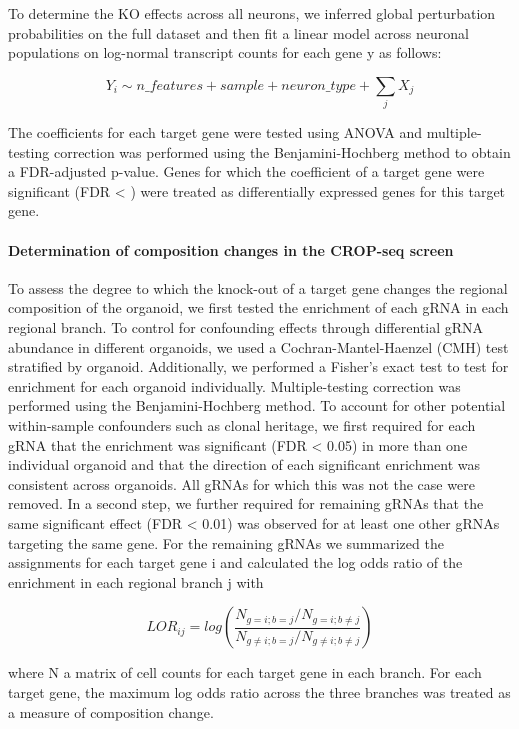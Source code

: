 To determine the KO effects across all neurons, we inferred global perturbation probabilities on the full dataset and then fit a linear model across neuronal populations on log-normal transcript counts for each gene y as follows:
 
\[ Y_i \sim n\_features + sample + neuron\_type + \sum_j X_j \]
 
The coefficients for each target gene were tested using ANOVA and multiple-testing correction was performed using the Benjamini-Hochberg method to obtain a FDR-adjusted p-value. Genes for which the coefficient of a target gene were significant (FDR < ) were treated as differentially expressed genes for this target gene.
 
 
\paragraph{Determination of composition changes in the CROP-seq screen}
To assess the degree to which the knock-out of a target gene changes the regional composition of the organoid, we first tested the enrichment of each gRNA in each regional branch. To control for confounding effects through differential gRNA abundance in different organoids, we used a Cochran-Mantel-Haenzel (CMH) test stratified by organoid. Additionally, we performed a Fisher’s exact test to test for enrichment for each organoid individually. Multiple-testing correction was performed using the Benjamini-Hochberg method. To account for other potential within-sample confounders such as clonal heritage, we first required for each gRNA that the enrichment was significant (FDR < 0.05) in more than one individual organoid and that the direction of each significant enrichment was consistent across organoids. All gRNAs for which this was not the case were removed. In a second step, we further required for remaining gRNAs that the same significant effect (FDR < 0.01) was observed for at least one other gRNAs targeting the same gene. For the remaining gRNAs we summarized the assignments for each target gene i  and calculated the log odds ratio of the enrichment in each regional branch j with
 
\[ LOR_{ij} = log(\frac{N_{g=i;b=j} / N_{g=i;b\neq j}} {N_{g\neq i;b=j} / N_{g\neq i;b\neq j}} ) \]   
 
where N a matrix of cell counts for each target gene in each branch. For each target gene, the maximum log odds ratio across the three branches was treated as a measure of composition change.
 
 
